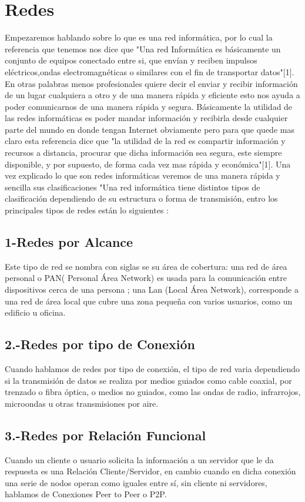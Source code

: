 \documentclass{bmcart}
\begin{document}
\section*{Redes}
Empezaremos hablando sobre lo que es una red informática, por lo cual la referencia que tenemos nos dice que "Una red Informática es básicamente un conjunto de equipos conectado entre si, que envían y reciben impulsos eléctricos,ondas electromagnéticas o similares con el fin de transportar datos"[1]. En otras palabras menos profesionales quiere decir el enviar y recibir información de un lugar cualquiera a otro y de una manera rápida y eficiente esto nos ayuda a poder comunicarnos de una manera rápida y segura. Básicamente la utilidad de las redes informáticas es poder mandar información y recibirla desde cualquier parte del mundo en donde tengan Internet obviamente pero para que quede mas claro esta referencia dice que "la utilidad de la red es compartir información y recursos a distancia, procurar que dicha información sea segura, este siempre disponible, y por supuesto, de forma cada vez mas rápida y económica"[1]. Una vez explicado lo que son redes informáticas veremos de una manera rápida y sencilla sus clasificaciones "Una red informática tiene distintos tipos de clasificación dependiendo de su estructura o forma de transmisión, entro los principales tipos de redes están lo siguientes :
\subsection*{1-Redes por Alcance}
Este tipo de red se nombra con siglas se su área de cobertura: una red de área personal o PAN( Personal Área Network) es usada para la comunicación entre dispositivos cerca de una persona ; una Lan (Local Área Network), corresponde a una red de área local que cubre una zona pequeña con varios usuarios, como un edificio u oficina.  
\subsection*{2.-Redes por tipo de Conexión}
Cuando hablamos de redes por tipo de conexión, el tipo de red varia dependiendo si la transmisión de datos se realiza por medios guiados como cable coaxial, por trenzado o fibra óptica, o medios no guiados, como las ondas de radio, infrarrojos, microondas u otras transmisiones por aire. 
\subsection*{3.-Redes por Relación Funcional}
Cuando un cliente o usuario solicita la información a un servidor que le da respuesta es una Relación Cliente/Servidor, en cambio cuando en dicha conexión una serie de nodos operan como iguales entre sí, sin cliente ni servidores, hablamos de Conexiones Peer to Peer o P2P.
\end{document}
